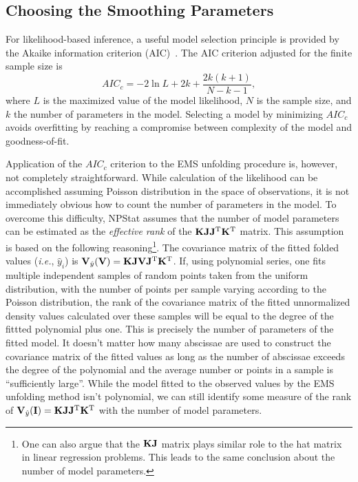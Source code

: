 \documentclass[12pt,titlepage]{article}
\newcommand{\supers}[1]{\ensuremath{^{\mbox{\scriptsize #1}}}}
\begin{document}
\subsection{Choosing the Smoothing Parameters}

For likelihood-based inference, a useful model selection principle
is provided by the Akaike information criterion (AIC)~\cite{ref:aic}.
The AIC criterion adjusted for the finite sample size is~\cite{ref:modelsel}
\begin{equation}
AIC_c = -2 \ln L + 2 k + \frac{2 k (k + 1)}{N - k - 1},
\label{eq:aicc}
\end{equation}
where $L$ is the maximized value of the model likelihood,
$N$ is the sample size, and $k$ the number of parameters
in the model. Selecting a model
by minimizing $AIC_c$ avoids overfitting by reaching a compromise
between complexity of the model and goodness-of-fit.

Application of the $AIC_c$ criterion to the EMS
unfolding procedure is, however, not completely straightforward.
While calculation of the likelihood
can be accomplished assuming Poisson distribution in the space
of observations,
it is not immediately obvious how to count the number of parameters
in the model. To overcome this difficulty,
NPStat assumes that the number of model parameters
can be estimated as the {\it effective rank} of the
${\bf K} {\bf J} {\bf J}\supers{T} {\bf K}\supers{T}$ matrix.
This assumption is based on the following reasoning\footnote{One can
also argue that the ${\bf K} {\bf J}$ matrix
plays similar role to the hat matrix in linear regression problems.
This leads to the same conclusion about the number of model parameters.}.
The covariance matrix of the fitted folded values ({\it i.e.}, $\hat{y}_i$) is
${\bf V}_{\hat{y}}({\bf V}) = {\bf K} {\bf J} {\bf V} {\bf J}\supers{T} {\bf K}\supers{T}$. If, using polynomial series, one fits multiple independent
samples of random points taken from the uniform distribution, with
the number of points per sample varying according to the Poisson distribution,
the rank of the covariance matrix of the
fitted unnormalized density values calculated over these samples
will be equal to the degree of the fittted polynomial plus one.
This is precisely the number of parameters of the fitted model.
It doesn't matter how many abscissae are used to construct the covariance
matrix of the fitted values as long as the number
of abscissae exceeds the degree of the polynomial and the
average number or points in a sample is ``sufficiently large''.
While the model fitted to the observed values by the EMS unfolding method
isn't polynomial, we can still identify some measure of the rank of 
${\bf V}_{\hat{y}}({\bf I}) = {\bf K} {\bf J} {\bf J}\supers{T} {\bf K}\supers{T}$ with the number of model parameters.
\end{document}

